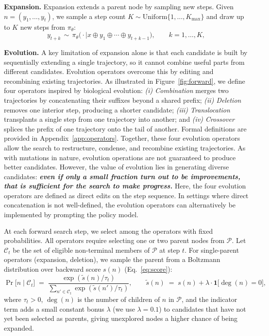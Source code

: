 \documentclass{llmxive}
\begin{document}
\textbf{Expansion.}
Expansion extends a parent node by sampling new steps. Given
$n=(y_1,\dots,y_{t})$, we sample a step count
$K\sim\mathrm{Uniform}\{1,\dots,K_{\max}\}$ and draw up to $K$ new steps from
$\pi_\theta$:
\begin{equation}
  y_{t+k}\,\sim\,\pi_\theta\bigl(\cdot\mid x\oplus y_1\oplus\cdots\oplus y_{t+k-1}\bigr),
  \qquad k=1,\dots,K,
  \label{eq:expand}
\end{equation}

\textbf{Evolution.} 
 A key limitation of expansion alone is that each candidate
is built by sequentially extending a single trajectory,
so it cannot combine useful parts from different candidates.
Evolution operators overcome this by editing and recombining
existing trajectories. As illustrated in Figure~\ref{fig:forward}, we define four operators inspired by biological evolution: \textit{(i) Combination} merges two trajectories by concatenating their suffixes beyond a shared prefix; \textit{(ii) Deletion} removes one interior step, producing a shorter candidate; \textit{(iii) Translocation} transplants a single step from one trajectory into another; and \textit{(iv) Crossover} splices the prefix of one trajectory onto the tail of another. Formal definitions are provided in Appendix~\ref{app:operators}. 
Together, these four evolution operators allow the search to restructure, condense, and recombine existing trajectories. As with mutations in nature, evolution operations are not guaranteed to produce better candidates. However, the value of evolution lies in generating diverse candidates: \textbf{\textit{even if only a small fraction turn out to be improvements, that is sufficient for the search to make progress.}}
Here, the four evolution operators are defined as direct edits on the step sequence. In settings where direct concatenation is not well-defined, the evolution operators can alternatively be implemented by prompting the policy model.


At each forward search step, we select among the operators with fixed
probabilities. All operators require selecting one or two parent nodes from
$\mathcal{P}$. Let $\mathcal{C}_t$ be the set of eligible non-terminal members of
$\mathcal{P}$ at step $t$. For single-parent operators (expansion, deletion), we sample the parent from a Boltzmann distribution over backward score $s(n)$ (Eq.~\ref{eq:score}):
\begin{equation}
  \Pr\bigl[n\mid\mathcal{C}_t\bigr]
    \;=\;\frac{\exp(\tilde{s}(n)/\tau_t)}
              {\sum_{n'\in\mathcal{C}_t}\exp(\tilde{s}(n')/\tau_t)},
  \qquad
  \tilde{s}(n) \;=\; s(n) + \lambda\cdot\mathbf{1}\!\bigl[\deg(n)=0\bigr],
  \label{eq:boltz}
\end{equation}
where $\tau_t>0$, $\deg(n)$ is the number of children of $n$ in
$\mathcal{P}$, and the indicator term adds a small constant bonus
$\lambda$ (we use $\lambda=0.1$) to candidates that have not yet been
selected as parents, giving unexplored nodes a higher chance of being expanded.
\end{document}
